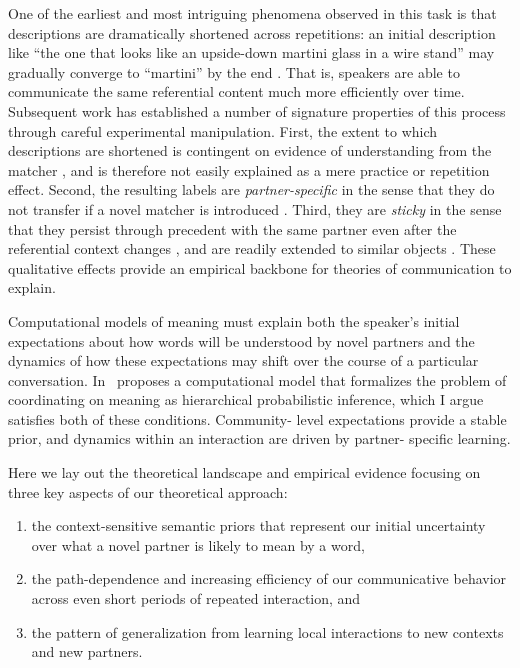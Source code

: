 \documentclass[11pt]{article}
\begin{document}
One of the earliest and most intriguing phenomena observed in this task is that descriptions are dramatically shortened across repetitions: an initial description like ``the one that looks like an upside-down martini glass in a wire stand'' may gradually converge to ``martini'' by the end  \cite{KraussWeinheimer64_ReferencePhrases}.
That is, speakers are able to communicate the same referential content much more efficiently over time.
Subsequent work has established a number of signature properties of this process through careful experimental manipulation.
First, the extent to which descriptions are shortened is contingent on evidence of understanding from the matcher \cite{KraussWeinheimer66_Tangrams,KraussEtAl77_AudioVisualBackChannel,HupetChantraine92_CollaborationOrRepitition}, and is therefore not easily explained as a mere practice or repetition effect.
Second, the resulting labels are \emph{partner-specific} in the sense that they do not transfer if a novel matcher is introduced \cite{WilkesGibbsClark92_CoordinatingBeliefs,MetzingBrennan03_PartnerSpecificPacts,brennan_partner-specific_2009}.
Third, they are \emph{sticky} in the sense that they persist through precedent with the same partner even after the referential context changes \cite{BrennanClark96_ConceptualPactsConversation}, and are readily extended to similar objects \cite{MarkmanMakin98_ReferentialCommunicationCategory}.
These qualitative effects provide an empirical backbone for theories of communication to explain. %


Computational models of meaning must explain both the speaker’s initial expectations about how words will be understood by novel partners and the dynamics of how these expectations may shift over the course of a particular conversation. In \ proposes a computational model that formalizes the problem of coordinating on meaning as hierarchical probabilistic inference, which I argue satisfies both of these conditions. Community- level expectations provide a stable prior, and dynamics within an interaction are driven by partner- specific learning.

Here we lay out the theoretical landscape and empirical evidence focusing on three key aspects of our theoretical approach: 
\begin{enumerate}
\item  the context-sensitive semantic priors that represent our initial uncertainty over what a novel partner is likely to mean by a word, 
\item the path-dependence and increasing efficiency of our communicative behavior across even short periods of repeated interaction, and 
\item the pattern of generalization from learning local interactions to new contexts and new partners. 
\end{enumerate}
\end{document}
